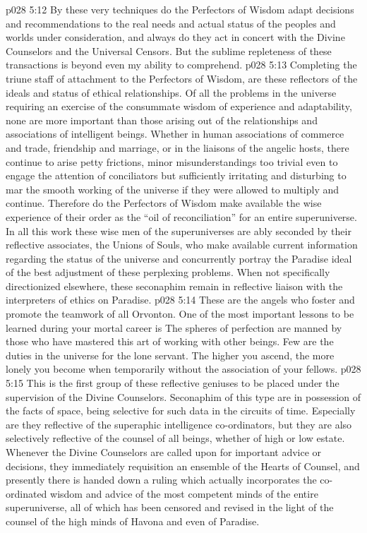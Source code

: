 \vs p028 5:12 By these very techniques do the Perfectors of Wisdom adapt decisions and recommendations to the real needs and actual status of the peoples and worlds under consideration, and always do they act in concert with the Divine Counselors and the Universal Censors. But the sublime repleteness of these transactions is beyond even my ability to comprehend.
\pc \vs p028 5:13 \bibnobreakspace {} Completing the triune staff of attachment to the Perfectors of Wisdom, are these reflectors of the ideals and status of ethical relationships. Of all the problems in the universe requiring an exercise of the consummate wisdom of experience and adaptability, none are more important than those arising out of the relationships and associations of intelligent beings. Whether in human associations of commerce and trade, friendship and marriage, or in the liaisons of the angelic hosts, there continue to arise petty frictions, minor misunderstandings too trivial even to engage the attention of conciliators but sufficiently irritating and disturbing to mar the smooth working of the universe if they were allowed to multiply and continue. Therefore do the Perfectors of Wisdom make available the wise experience of their order as the “oil of reconciliation” for an entire superuniverse. In all this work these wise men of the superuniverses are ably seconded by their reflective associates, the Unions of Souls, who make available current information regarding the status of the universe and concurrently portray the Paradise ideal of the best adjustment of these perplexing problems. When not specifically directionized elsewhere, these seconaphim remain in reflective liaison with the interpreters of ethics on Paradise.
\pc \vs p028 5:14 These are the angels who foster and promote the teamwork of all Orvonton. One of the most important lessons to be learned during your mortal career is  The spheres of perfection are manned by those who have mastered this art of working with other beings. Few are the duties in the universe for the lone servant. The higher you ascend, the more lonely you become when temporarily without the association of your fellows.
\pc \vs p028 5:15 \bibnobreakspace {} This is the first group of these reflective geniuses to be placed under the supervision of the Divine Counselors. Seconaphim of this type are in possession of the facts of space, being selective for such data in the circuits of time. Especially are they reflective of the superaphic intelligence co\hyp{}ordinators, but they are also selectively reflective of the counsel of all beings, whether of high or low estate. Whenever the Divine Counselors are called upon for important advice or decisions, they immediately requisition an ensemble of the Hearts of Counsel, and presently there is handed down a ruling which actually incorporates the co\hyp{}ordinated wisdom and advice of the most competent minds of the entire superuniverse, all of which has been censored and revised in the light of the counsel of the high minds of Havona and even of Paradise.
